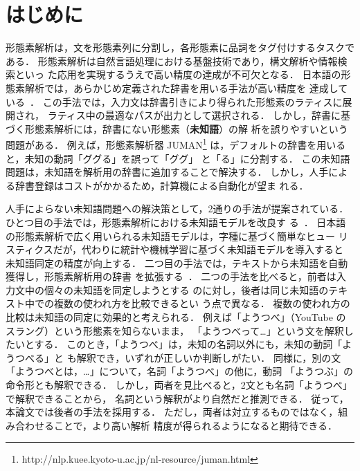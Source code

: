 \documentclass[japanese]{jnlp_1.4}
\begin{document}
\maketitle


\section{はじめに}

形態素解析は，文を形態素列に分割し，各形態素に品詞をタグ付けするタスクで
ある．
形態素解析は自然言語処理における基盤技術であり，構文解析や情報検索といっ
た応用を実現するうえで高い精度の達成が不可欠となる．
日本語の形態素解析では，あらかじめ定義された辞書を用いる手法が高い精度を
達成している~\cite{Kurohashi1994full,浅原正幸:2002,Kudo2004full}．
この手法では，入力文は辞書引きにより得られた形態素のラティスに展開され，
ラティス中の最適なパスが出力として選択される．
しかし，辞書に基づく形態素解析には，辞書にない形態素（{\bf 未知語}）の解
析を誤りやすいという問題がある．
例えば，形態素解析器
    JUMAN\footnote{http://nlp.kuee.kyoto-u.ac.jp/nl-resource/juman.html}
は，デフォルトの辞書を用いると，未知の動詞「ググる」を誤って「ググ」
と「る」に分割する．
この未知語問題は，未知語を解析用の辞書に追加することで解決する．
しかし，人手による辞書登録はコストがかかるため，計算機による自動化が望ま
れる．

人手によらない未知語問題への解決策として，2通りの手法が提案されている．
ひとつ目の手法では，形態素解析における未知語モデルを改良す
る~\cite{Nagata1999full,内元清貴:2001,Asahara2004full,東藍:2006}．
日本語の形態素解析で広く用いられる未知語モデルは，字種に基づく簡単なヒュー
リスティクスだが，代わりに統計や機械学習に基づく未知語モデルを導入すると
未知語同定の精度が向上する．
二つ目の手法では，テキストから未知語を自動獲得し，形態素解析用の辞書
を拡張する~\cite{Mori1996full}．
二つの手法を比べると，前者は入力文中の個々の未知語を同定しようとする
のに対し，後者は同じ未知語のテキスト中での複数の使われ方を比較できるとい
う点で異なる．
複数の使われ方の比較は未知語の同定に効果的と考えられる．
例えば「ようつべ」（YouTube のスラング）という形態素を知らないまま，
「ようつべって…」という文を解釈したいとする．
このとき，「ようつべ」は，未知の名詞以外にも，未知の動詞「ようつべる」と
も解釈でき，いずれが正しいか判断しがたい．
同様に，別の文「ようつべとは，…」について，名詞「ようつべ」の他に，動詞
「ようつぶ」の命令形とも解釈できる．
しかし，両者を見比べると，2文とも名詞「ようつべ」で解釈できることから，
名詞という解釈がより自然だと推測できる．
従って，本論文では後者の手法を採用する．
ただし，両者は対立するものではなく，組み合わせることで，より高い解析
精度が得られるようになると期待できる．
\end{document}
